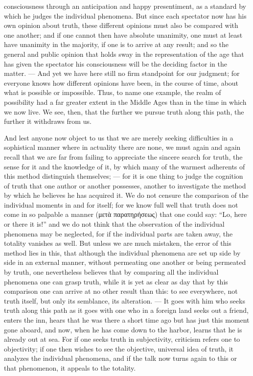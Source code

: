 \documentclass[12pt]{book}
\newcommand{\opage}[1]{\marginnote{\footnotesize\textit{[#1]}}}
\begin{document}
consciousness through an anticipation and happy presentiment, as a standard by
which he judges the individual phenomena. But since each spectator now has his
own opinion about truth, these different opinions must also be compared with
one another; and if one cannot then have absolute unanimity, one must at least
have unanimity in the majority, if one is to arrive at any result; and so the
general and public opinion that holds sway in the representation of the age
that has given the spectator his consciousness will be the deciding factor in
the matter. --- And yet we have here still no firm standpoint for our
judgment; for everyone knows how different opinions have been, in the course of
time, about what is possible or impossible. Thus, to name one example, the
realm of possibility had a far greater extent in the Middle Ages than in the
time in which we now live. We see, then, that the further we pursue truth along
this path, the further it withdraws from us.

And lest anyone now object to us that we are merely seeking difficulties in a
sophistical manner where in actuality there are none, we must again and again
recall that we are far from failing to appreciate the sincere search for truth,
the sense for it and the knowledge of it, by which many of the warmest
adherents of this method distinguish themselves; --- for it is one thing to
judge the cognition of truth that one author or another possesses, another to
investigate the method by which he believes he has
\opage{17}acquired it. We do not censure the comparison of the individual moments in and
for itself; for we know full well that truth does not come in so palpable a
manner (μετὰ παρατηρήσεως) that one could say: ``Lo, here or there it
is!'' and we do not think that the observation of the individual phenomena may
be neglected, for if the individual parts are taken away, the totality vanishes
as well. But unless we are much mistaken, the error of this method lies in
this, that although the individual phenomena are set up side by side in an
external manner, without permeating one another or being permeated by truth,
one nevertheless believes that by comparing all the individual phenomena one can
grasp truth, while it is yet as clear as day that by this comparison one can
arrive at no other result than this: to see everywhere, not truth itself, but
only its semblance, its alteration. --- It goes with him who seeks truth along
this path as it goes with one who in a foreign land seeks out a friend, enters
the inn, hears that he was there a short time ago but has just this moment gone
aboard, and now, when he has come down to the harbor, learns that he is already
out at sea. For if one seeks truth in subjectivity, criticism refers one to
objectivity; if one then wishes to see the objective, universal idea of truth,
it analyzes the individual phenomena, and if the talk now turns again to this
or that phenomenon, it appeals to the totality.
\end{document}
